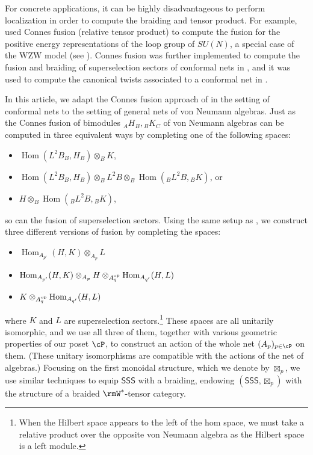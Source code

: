 \documentclass[11pt,reqno]{amsart}
\DeclareMathOperator{\Hom}{Hom}
\newcommand{\SSS}{\mathsf{SSS}}
\numberwithin{equation}{section}
\theoremstyle{plain}
\theoremstyle{definition}
\begin{document}
For concrete applications, it can be highly disadvantageous to perform localization in order to compute the braiding and tensor product.
For example, \cite{MR1645078} used Connes fusion (relative tensor product) \cite{MR1303779,MR703809} to compute the fusion for the positive energy representations of the loop group of $SU(N)$, a special case of the WZW model (see \cite{MR1152377}).
Connes fusion was further implemented to compute the fusion and braiding of superselection sectors of conformal nets in \cite{MR4239831}, and it was used to compute the canonical twists associated to a conformal net in \cite{2605.18446}.

In this article, we adapt the Connes fusion approach of \cite{MR4239831} in the setting of conformal nets to the setting of general nets of von Neumann algebras.
Just as the Connes fusion of bimodules ${}_AH_B, {}_BK_C$ of von Neumann algebras can be computed in three equivalent ways by completing one of the following spaces:
\begin{itemize}
\item 
$\Hom(L^2B_B, H_B) \otimes_B K$,
\item 
$\Hom(L^2B_B, H_B) \otimes_B L^2B \otimes_B \Hom({}_BL^2B, {}_BK)$, or
\item 
$H\otimes_B \Hom({}_BL^2B, {}_BK)$,
\end{itemize}
so can the fusion of superselection sectors.
Using the same setup as \cite{MR4927814}, we construct three different versions of fusion by completing the spaces:
\begin{itemize}
\item $\Hom_{A_{p'}}(H,K)\otimes_{A_p} L$
\item $\Hom_{A_{p'}}(H, K)\otimes_{A_p} H\otimes_{A_q^{\rm op}} \Hom_{A_{q'}}(H, L)$
\item $K \otimes_{A_q^{\rm op}} \Hom_{A_{q'}}(H, L)$
\end{itemize}
where $K$ and $L$ are superselection sectors.\footnote{When the Hilbert space appears to the left of the hom space, we must take a relative product over the opposite von Neumann algebra as the Hilbert space is a left module.}
These spaces are all unitarily isomorphic, and we use all three of them, together with various geometric properties of our poset $\cP$, to construct an action of the whole net $(A_p)_{p\in \cP}$ on them.
(These unitary isomorphisms are compatible with the actions of the net of algebras.)
Focusing on the first monoidal structure, which we denote by $\boxtimes_p$, we use similar techniques to equip $\SSS$ with a braiding, endowing $(\SSS,\boxtimes_p)$ with the structure of a braided $\rmW^*$-tensor category.
\end{document}
